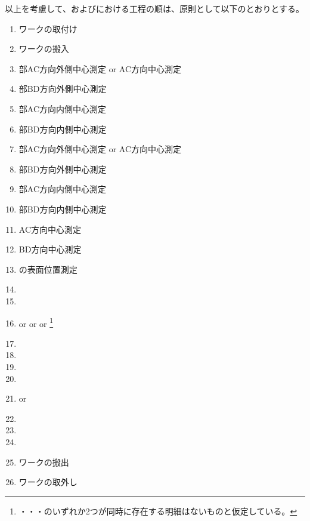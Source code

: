 \clearpage
以上を考慮して、\DMC および\MMC における工程の順は、原則として以下のとおりとする。
\begin{enumerate}[label={\arabic*.}]
\item ワークの取付け
\item ワークの搬入
\item \BottomEndFace 部AC方向外側中心測定 or \BottomOutcut AC方向中心測定
\item \BottomEndFace 部BD方向外側中心測定
\item \BottomEndFace 部AC方向内側中心測定
\item \BottomEndFace 部BD方向内側中心測定
\item \TopEndFace 部AC方向外側中心測定 or \TopOutcut AC方向中心測定
\item \TopEndFace 部BD方向外側中心測定
\item \TopEndFace 部AC方向内側中心測定
\item \TopEndFace 部BD方向内側中心測定
\item \Keyway AC方向中心測定
\item \Keyway BD方向中心測定
\item \Dimple の表面位置測定
\item \DimpleMilling
\item \TopEndFacecutMilling
\item \TopOutcutMilling or \TopCurvedOutcutMilling or \EndFaceBoringMilling or \IncutBoringMilling
\footnote{\TopOutcut・\TopCurvedOutcutMilling・\EndFaceBoring・\IncutBoring のいずれか2つが同時に存在する明細はないものと仮定している。}
\item \KeywayMilling
\item \TopEndFaceOutCChamferMilling
\item \TopEndFaceInCChamferMilling
\item \BottomEndFacecutMilling
\item \BottomOutcutMilling or \BottomCurvedOutcutMilling
\item \BottomEndFaceOutCChamferMilling
\item \BottomEndFaceInCChamferMilling
\item \CenterlineEndFaceDifMeasurement
\item ワークの搬出
\item ワークの取外し
\end{enumerate}
